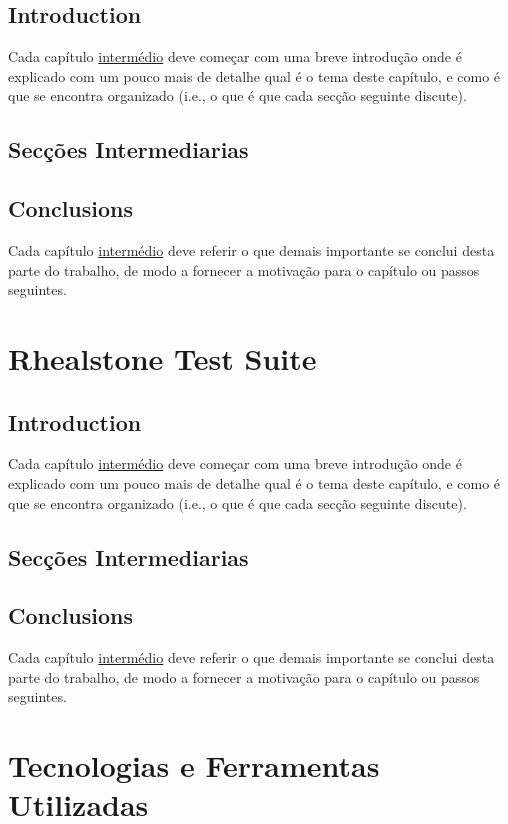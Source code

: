 \documentclass[titlepage,12pt,a4paper,times]{book}
\begin{document}
\section{Introduction}
\label{chap2:sec:intro}
Cada capítulo \underline{intermédio} deve começar com uma breve introdução onde
é explicado com um pouco mais de detalhe qual é o tema deste capítulo, e como é
que se encontra organizado (i.e., o que é que cada secção seguinte discute).

\section{Secções Intermediarias}
\label{chap2:sec:...}

\section{Conclusions}
\label{chap2:sec:concs}
Cada capítulo \underline{intermédio} deve referir o que demais importante se
conclui desta parte do trabalho, de modo a fornecer a motivação para o capítulo
ou passos seguintes.

\chapter{Rhealstone Test Suite}
\label{chap:rts}

\section{Introduction}
\label{chap2:sec:intro}
Cada capítulo \underline{intermédio} deve começar com uma breve introdução onde
é explicado com um pouco mais de detalhe qual é o tema deste capítulo, e como é
que se encontra organizado (i.e., o que é que cada secção seguinte discute).

\section{Secções Intermediarias}
\label{chap2:sec:...}

\section{Conclusions}
\label{chap2:sec:concs}
Cada capítulo \underline{intermédio} deve referir o que demais importante se
conclui desta parte do trabalho, de modo a fornecer a motivação para o capítulo
ou passos seguintes.

\chapter{Tecnologias e Ferramentas Utilizadas}
\label{chap:tecno-ferra}
\end{document}
